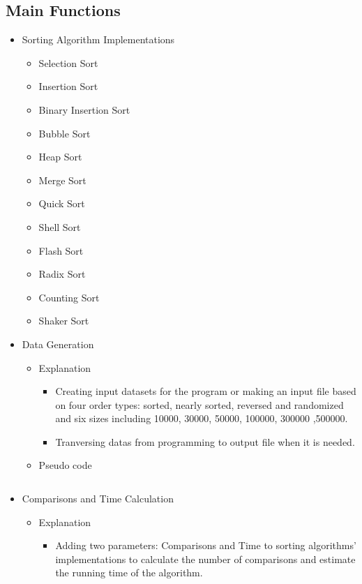 \subsection{Main Functions}
\begin{itemize}
    \item Sorting Algorithm Implementations
    \begin{itemize}
        \item Selection Sort
        \item Insertion Sort
        \item Binary Insertion Sort
        \item Bubble Sort
        \item Heap Sort
        \item Merge Sort
        \item Quick Sort
        \item Shell Sort
        \item Flash Sort
        \item Radix Sort
        \item Counting Sort
        \item Shaker Sort
    \end{itemize}
    \item Data Generation
    \begin{itemize}
        \item Explanation
        \begin{itemize}
            \item Creating input datasets for the program or making an input file based on four order types: sorted, nearly sorted, reversed and randomized and six sizes including 10000, 30000, 50000, 100000, 300000 ,500000.
            \item Tranversing datas from programming to output file when it is needed.
        \end{itemize}
        \item Pseudo code
        \begin{verbatim}
        \end{verbatim}
    \end{itemize}
    \item Comparisons and Time Calculation
    \begin{itemize}
        \item Explanation
        \begin{itemize}
            \item Adding two parameters: Comparisons and Time to sorting algorithms' implementations to calculate the number of comparisons and estimate the running time of the algorithm.

\end{itemize}
\end{itemize}
\end{itemize}
